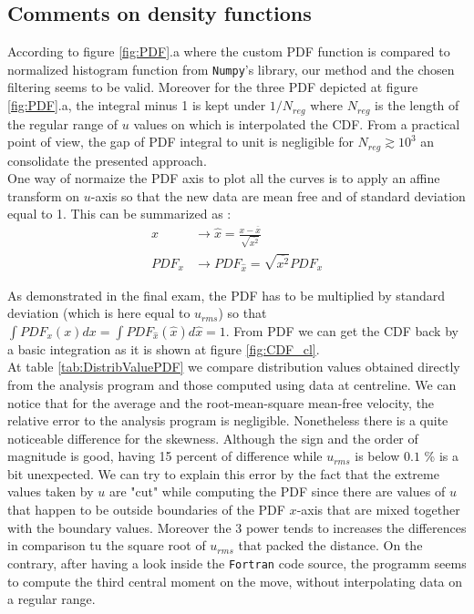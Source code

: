 \documentclass[12pt]{article}
\begin{document}
\subsection{Comments on density functions}

According to figure \ref{fig:PDF}.a where the custom PDF function is compared to normalized histogram function from \verb|Numpy|'s library, our method and the chosen filtering seems to be valid. Moreover for the three PDF depicted at figure \ref{fig:PDF}.a, the integral minus 1 is kept under $1/N_{reg}$ where $N_{reg}$ is the length of the regular range of $u$ values on which is interpolated the CDF. From a practical point of view, the gap of PDF integral to unit is negligible for $N_{reg} \gtrsim 10^3$ an consolidate the presented approach.\\

One way of normaize the PDF axis to plot all the curves is to apply an affine transform on $u$-axis so that the new data are mean free and of standard deviation equal to 1. This can be summarized as :
\begin{align}
    x &\rightarrow \hat{x} = \frac{x - \overline{x}}{\sqrt{\overline{x^2}}} \\
    PDF_x & \rightarrow PDF_{\hat{x}} = \sqrt{\overline{x^2}} PDF_x
\end{align}

As demonstrated in the final exam, the PDF has to be multiplied by standard deviation (which is here equal to $u_{rms}$) so that $\int PDF_x(x) dx = \int PDF_{\hat{x}}(\hat{x}) d\hat{x} = 1$. From PDF we can get the CDF back by a basic integration as it is shown at figure \ref{fig:CDF_cl}.\\

At table \ref{tab:DistribValuePDF} we compare distribution values obtained directly from the analysis program and those computed using data at centreline. We can notice that for the average and the root-mean-square mean-free velocity, the relative error to the analysis program is negligible. Nonetheless there is a quite noticeable difference for the skewness. Although the sign and the order of magnitude is good, having 15 percent of difference while $u_{rms}$ is below $0.1$ \% is a bit unexpected. We can try to explain this error by the fact that the extreme values taken by $u$ are "cut" while computing the PDF since there are values of $u$ that happen to be outside boundaries of the PDF $x$-axis that are mixed together with the boundary values. Moreover the 3 power tends to increases the differences in comparison tu the square root of $u_{rms}$ that packed the distance. On the contrary, after having a look inside the \verb|Fortran| code source, the programm seems to compute the third central moment on the move, without interpolating data on a regular range.\\
\end{document}

